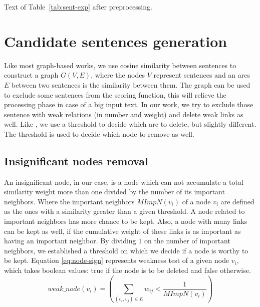 \begin{table}[ht]
	\centering
	\caption{Text of Table~\ref{tab:sent-exp} after  preprocessing.}
	\label{tab:preprocess-exp}
	{\scriptsize
	}
\end{table}


\section{Candidate sentences generation}

Like most graph-based works, we use cosine similarity between sentences to construct a graph $ G(V, E) $, where the nodes $ V $ represent sentences and an arcs $ E $ between two sentences is the similarity between them. 
The graph can be used to exclude some sentences from the scoring function, this will relieve the processing phase in case of a big input text. 
In our work, we try to exclude those sentence with weak relations (in number and weight) and delete weak links as well. 
Like \citet{04-erkan-radev}, we use a threshold to decide which arc to delete, but slightly different. 
The threshold is used to decide which node to remove as well.

\subsection{Insignificant nodes removal}

An insignificant node, in our case, is a node which can not accumulate a total similarity weight more than one divided by the number of its important neighbors. 
Where the important neighbors $ MImpN(v_i) $ of a node $ v_i $ are defined as the ones with a similarity greater than a given threshold.
A node related to important neighbors has more chance to be kept. 
Also, a node with many links can be kept as well, if the cumulative weight of these links is as important as having an important neighbor. 
By dividing $ 1 $ on the number of important neighbors, we established a threshold on which we decide if a node is worthy to be kept.
Equation \ref{eq:node-sign} represents weakness test of a given node $ v_i $, which takes boolean values: true if the node is to be deleted and false otherwise.
\begin{equation}
	weak\_node(v_i) = ( \sum_{(v_i, v_j) \in E} w_{ij} < \frac{1}{MImpN(v_i)} )
	\label{eq:node-sign}
\end{equation}

